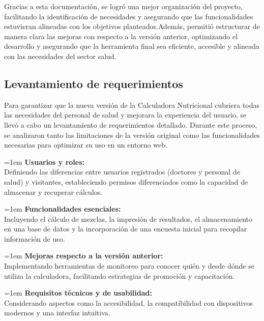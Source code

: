 \documentclass[12pt,letterpaper,spanish, xcolor=table]{report}
\numberwithin{figure}{subsection}
\begin{document}
	Gracias a esta documentación, se logró una mejor organización del proyecto, facilitando la identificación de necesidades y asegurando que las funcionalidades estuvieran alineadas con los objetivos planteados.Además, permitió estructurar de manera clara las mejoras con respecto a la versión anterior, optimizando el desarrollo y asegurando que la herramienta final sea eficiente, accesible y alineada con las necesidades del sector salud.

\subsection{Levantamiento de requerimientos}

	Para garantizar que la nueva versión de la Calculadora Nutricional cubriera todas las necesidades del personal de salud y mejorara la experiencia del usuario, se llevó a cabo un levantamiento de requerimientos detallado. Durante este proceso, se analizaron tanto las limitaciones de la versión original como las funcionalidades necesarias para optimizar su uso en un entorno web.\\
	
	{\leftskip=1em 
	\noindent 
	\textbf{Usuarios y roles:}\\ 
	Definiendo las diferencias entre usuarios registrados (doctores y personal de salud) y visitantes, estableciendo permisos diferenciados como la capacidad de almacenar y recuperar cálculos.\\
	\par}

	{\leftskip=1em 
	\noindent 
	\textbf{Funcionalidades esenciales:}\\
	Incluyendo el cálculo de mezclas, la impresión de resultados, el almacenamiento en una base de datos y la incorporación de una encuesta inicial para recopilar información de uso.\\
	\par}
	
	{\leftskip=1em 
	\noindent 
	\textbf{Mejoras respecto a la versión anterior:}\\
	Implementando herramientas de monitoreo para conocer quién y desde dónde se utiliza la calculadora, facilitando estrategias de promoción y capacitación.\\
	\par}
	
	{\leftskip=1em 
	\noindent 
	\textbf{Requisitos técnicos y de usabilidad:}\\
	Considerando aspectos como la accesibilidad, la compatibilidad con dispositivos modernos y una interfaz intuitiva.\\
	\par}
\end{document}
